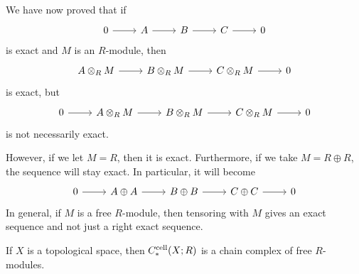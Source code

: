 \documentclass{standalone}
\begin{document}
We have now proved that if
\[
  \begin{tikzcd}
  	0 \ar[r] &
  	A \ar[r] &
  	B \ar[r] &
  	C \ar[r] &
  	0
  \end{tikzcd}
\]
is exact and \(M\) is an \(R\)-module, then
\[
  \begin{tikzcd}
  	A \otimes_R M \ar[r] &
  	B \otimes_R M \ar[r] &
  	C \otimes_R M \ar[r] &
  	0
  \end{tikzcd}
\]
is exact, but
\[
  \begin{tikzcd}
  	0 \ar[r] &
  	A \otimes_R M \ar[r] &
  	B \otimes_R M \ar[r] &
  	C \otimes_R M \ar[r] &
  	0
  \end{tikzcd}
\]
is not necessarily exact.

However, if we let \(M = R\), then it is exact.
Furthermore, if we take \(M = R \oplus R\), the sequence will stay exact.
In particular, it will become
\[
  \begin{tikzcd}
    0 \arrow[r] &
    A \oplus A \arrow[r] &
    B \oplus B \arrow[r] &
    C \oplus C \arrow[r] &
    0
  \end{tikzcd}
\]
In general, if \(M\) is a free \(R\)-module, then tensoring with \(M\)
gives an exact sequence and not just a right exact sequence.

\begin{note}
  If \(X\) is a topological space, then \(C^{\text{cell}}_*(X; R)\) is
  a chain complex of free \(R\)-modules.
\end{note}
\end{document}
